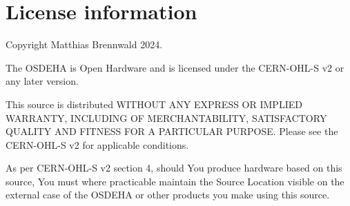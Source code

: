 \section{License information}
Copyright Matthias Brennwald 2024.                                                    

The OSDEHA is Open Hardware and is licensed under the CERN-OHL-S v2 or any later version.


This source is distributed WITHOUT ANY EXPRESS OR IMPLIED WARRANTY, INCLUDING OF MERCHANTABILITY, SATISFACTORY QUALITY AND FITNESS FOR A PARTICULAR PURPOSE. Please see the CERN-OHL-S v2 for applicable conditions.


As per CERN-OHL-S v2 section 4, should You produce hardware based on this source, You must where practicable maintain the Source Location visible on the external case of the OSDEHA or other products you make using this source.            


% 
% 


